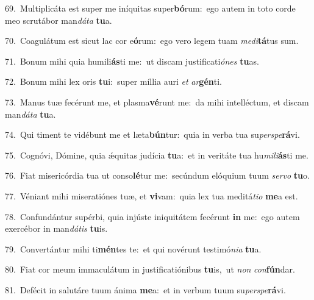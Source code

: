 {\numbfont\textcolor{\numbcolor}{69.}}~Multiplicáta est super me iníquitas super\-\textbf{bó}\-rum:~\star ego autem in toto corde meo scrutábor man\-\textit{dá}\-\textit{ta} \textbf{tu}\-a.\par
{\numbfont\textcolor{\numbcolor}{70.}}~Coagulátum est sicut lac cor e\-\textbf{ó}\-rum:~\star ego vero legem tuam \textit{me}\-\textit{di}\textbf{tá}tus sum.\par
{\numbfont\textcolor{\numbcolor}{71.}}~Bonum mihi quia humili\-\textbf{ás}\-ti me:~\star ut discam justificati\-\textit{ó}\-\textit{nes} \textbf{tu}\-as.\par
{\numbfont\textcolor{\numbcolor}{72.}}~Bonum mihi lex oris \textbf{tu}\-i:~\star super míllia auri \textit{et} \textit{ar}\-\textbf{gén}ti.\par
{\numbfont\textcolor{\numbcolor}{73.}}~Manus tuæ fecérunt me, et plasma\-\textbf{vé}\-runt me:~\star da mihi intelléctum, et discam man\-\textit{dá}\-\textit{ta} \textbf{tu}\-a.\par
{\numbfont\textcolor{\numbcolor}{74.}}~Qui timent te vidébunt me et læta\-\textbf{bún}\-tur:~\star quia in verba tua su\-\textit{per}\-\textit{spe}\textbf{rá}vi.\par
{\numbfont\textcolor{\numbcolor}{75.}}~Cognóvi, Dómine, quia ǽquitas judícia \textbf{tu}\-a:~\star et in veritáte tua hu\-\textit{mi}\-\textit{li}\textbf{ás}ti me.\par
{\numbfont\textcolor{\numbcolor}{76.}}~Fiat misericórdia tua ut conso\-\textbf{lé}\-tur me:~\star secúndum elóquium tuum \textit{ser}\-\textit{vo} \textbf{tu}\-o.\par
{\numbfont\textcolor{\numbcolor}{77.}}~Véniant mihi miseratiónes tuæ, et \textbf{vi}\-vam:~\star quia lex tua meditá\-\textit{ti}\-\textit{o} \textbf{me}\-a est.\par
{\numbfont\textcolor{\numbcolor}{78.}}~Confundántur supérbi, quia injúste iniquitátem fecérunt \textbf{in} me:~\star ego autem exercébor in man\-\textit{dá}\-\textit{tis} \textbf{tu}\-is.\par
{\numbfont\textcolor{\numbcolor}{79.}}~Convertántur mihi ti\-\textbf{mén}\-tes te:~\star et qui novérunt testimó\-\textit{ni}\-\textit{a} \textbf{tu}\-a.\par
{\numbfont\textcolor{\numbcolor}{80.}}~Fiat cor meum immaculátum in justificatiónibus \textbf{tu}\-is,~\star ut \textit{non} \textit{con}\-\textbf{fún}dar.\par
{\numbfont\textcolor{\numbcolor}{81.}}~Defécit in salutáre tuum ánima \textbf{me}\-a:~\star et in verbum tuum su\-\textit{per}\-\textit{spe}\textbf{rá}vi.\par
